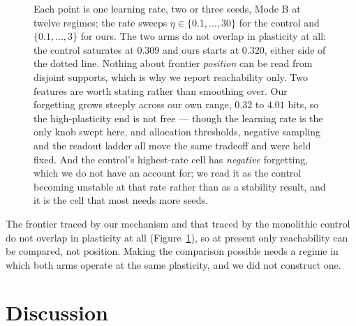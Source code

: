 \documentclass[11pt,a4paper]{article}
\begin{document}
\begin{figure}[h]
\centering
{}
\caption{Each point is one learning rate, two or three seeds, Mode B at twelve
regimes; the rate sweeps $\eta\in\{0.1,\dots,30\}$ for the control and
$\{0.1,\dots,3\}$ for ours. The two arms do not overlap in plasticity at all:
the control saturates at $0.309$ and ours starts at $0.320$, either side of
the dotted line. Nothing about
frontier \emph{position} can be read from disjoint supports, which is why we
report reachability only. Two features are worth stating rather than smoothing over. Our forgetting grows
steeply across our own range, $0.32$ to $4.01$ bits, so the high-plasticity end
is not free --- though the learning rate is the only knob swept here, and
allocation thresholds, negative sampling and the readout ladder all move the
same tradeoff and were held fixed. And the control's highest-rate cell has
\emph{negative} forgetting, which we do not have an account for; we read it as
the control becoming unstable at that rate rather than as a stability result,
and it is the cell that most needs more seeds.}
\label{fig:pareto}
\end{figure}

The frontier traced by our mechanism and that traced by the monolithic control
do not overlap in plasticity at all (Figure~\ref{fig:pareto}), so at present
only reachability can be compared, not position. Making the comparison possible
needs a regime in which both arms operate at the same plasticity, and we did
not construct one.

\section{Discussion}
\end{document}
